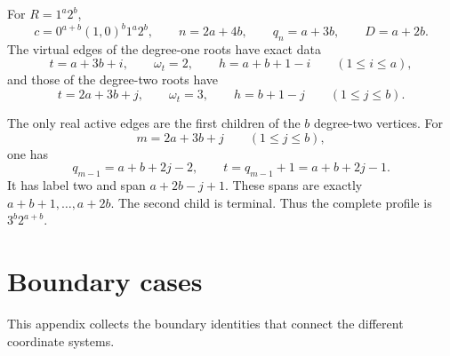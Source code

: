 \documentclass[11pt]{article}
\theoremstyle{definition}
\theoremstyle{remark}
\begin{document}
For \(R=1^a2^b\),
\[
 c=0^{a+b}(1,0)^b1^a2^b,
 \qquad n=2a+4b,
 \qquad q_n=a+3b,
 \qquad D=a+2b.
\]
The virtual edges of the degree-one roots have exact data
\[
 t=a+3b+i,
 \qquad \omega_t=2,
 \qquad h=a+b+1-i
 \qquad(1\leq i\leq a),
\]
and those of the degree-two roots have
\[
 t=2a+3b+j,
 \qquad \omega_t=3,
 \qquad h=b+1-j
 \qquad(1\leq j\leq b).
\]

The only real active edges are the first children of the \(b\) degree-two
vertices.  For
\[
 m=2a+3b+j\qquad(1\leq j\leq b),
\]
one has
\[
 q_{m-1}=a+b+2j-2,
 \qquad
 t=q_{m-1}+1=a+b+2j-1.
\]
It has label two and span \(a+2b-j+1\).  These spans are exactly
\(a+b+1,\ldots,a+2b\).  The second child is terminal.  Thus the complete
profile is \(3^b2^{a+b}\).

\section{Boundary cases}


This appendix collects the boundary identities that connect the different
coordinate systems.
\end{document}
